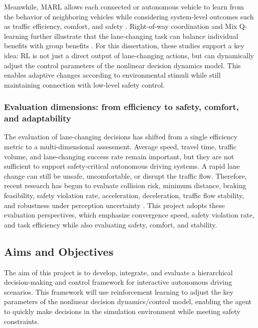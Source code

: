 Meanwhile, MARL allows each connected or autonomous vehicle to learn from the behavior of neighboring vehicles while considering system-level outcomes such as traffic efficiency, comfort, and safety \cite{R12}. Right-of-way coordination and Mix Q-learning further illustrate that the lane-changing task can balance individual benefits with group benefits \cite{R13,R14}. For this dissertation, these studies support a key idea: RL is not just a direct output of lane-changing actions, but can dynamically adjust the control parameters of the nonlinear decision dynamics model. This enables adaptive changes according to environmental stimuli while still maintaining connection with low-level safety control.



\subsubsection{Evaluation dimensions: from efficiency to safety, comfort, and adaptability}





The evaluation of lane-changing decisions has shifted from a single efficiency metric to a multi-dimensional assessment. Average speed, travel time, traffic volume, and lane-changing success rate remain important, but they are not sufficient to support safety-critical autonomous driving systems. A rapid lane change can still be unsafe, uncomfortable, or disrupt the traffic flow. Therefore, recent research has begun to evaluate collision risk, minimum distance, braking feasibility, safety violation rate, acceleration, deceleration, traffic flow stability, and robustness under perception uncertainty \cite{R7,R8,R10,R15}. This project adopts these evaluation perspectives, which emphasize convergence speed, safety violation rate, and task efficiency while also evaluating safety, comfort, and stability.





\subsection{Aims and Objectives}





The aim of this project is to develop, integrate, and evaluate a hierarchical decision-making and control framework for interactive autonomous driving scenarios. This framework will use reinforcement learning to adjust the key parameters of the nonlinear decision dynamics/control model, enabling the agent to quickly make decisions in the simulation environment while meeting safety constraints.



